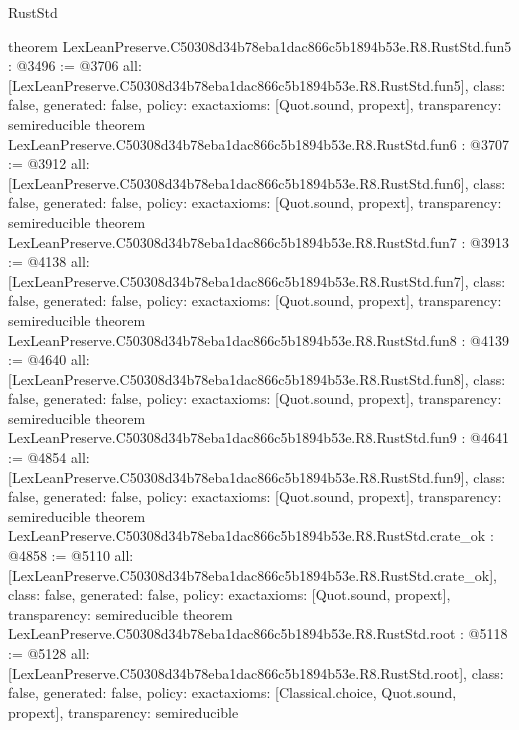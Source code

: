 \begin{lexlean}{RustStd}
\begin{coremodule}
{}
theorem LexLeanPreserve.C50308d34b78eba1dac866c5b1894b53e.R8.RustStd.fun5 : @3496 := @3706 {
  all: [LexLeanPreserve.C50308d34b78eba1dac866c5b1894b53e.R8.RustStd.fun5],
  class: false,
  generated: false,
  policy: exact{axioms: [Quot.sound, propext]},
  transparency: semireducible
}
theorem LexLeanPreserve.C50308d34b78eba1dac866c5b1894b53e.R8.RustStd.fun6 : @3707 := @3912 {
  all: [LexLeanPreserve.C50308d34b78eba1dac866c5b1894b53e.R8.RustStd.fun6],
  class: false,
  generated: false,
  policy: exact{axioms: [Quot.sound, propext]},
  transparency: semireducible
}
theorem LexLeanPreserve.C50308d34b78eba1dac866c5b1894b53e.R8.RustStd.fun7 : @3913 := @4138 {
  all: [LexLeanPreserve.C50308d34b78eba1dac866c5b1894b53e.R8.RustStd.fun7],
  class: false,
  generated: false,
  policy: exact{axioms: [Quot.sound, propext]},
  transparency: semireducible
}
theorem LexLeanPreserve.C50308d34b78eba1dac866c5b1894b53e.R8.RustStd.fun8 : @4139 := @4640 {
  all: [LexLeanPreserve.C50308d34b78eba1dac866c5b1894b53e.R8.RustStd.fun8],
  class: false,
  generated: false,
  policy: exact{axioms: [Quot.sound, propext]},
  transparency: semireducible
}
theorem LexLeanPreserve.C50308d34b78eba1dac866c5b1894b53e.R8.RustStd.fun9 : @4641 := @4854 {
  all: [LexLeanPreserve.C50308d34b78eba1dac866c5b1894b53e.R8.RustStd.fun9],
  class: false,
  generated: false,
  policy: exact{axioms: [Quot.sound, propext]},
  transparency: semireducible
}
theorem LexLeanPreserve.C50308d34b78eba1dac866c5b1894b53e.R8.RustStd.crate_ok : @4858 := @5110 {
  all: [LexLeanPreserve.C50308d34b78eba1dac866c5b1894b53e.R8.RustStd.crate_ok],
  class: false,
  generated: false,
  policy: exact{axioms: [Quot.sound, propext]},
  transparency: semireducible
}
theorem LexLeanPreserve.C50308d34b78eba1dac866c5b1894b53e.R8.RustStd.root : @5118 := @5128 {
  all: [LexLeanPreserve.C50308d34b78eba1dac866c5b1894b53e.R8.RustStd.root],
  class: false,
  generated: false,
  policy: exact{axioms: [Classical.choice, Quot.sound, propext]},
  transparency: semireducible
}


\end{coremodule}
\end{lexlean}
